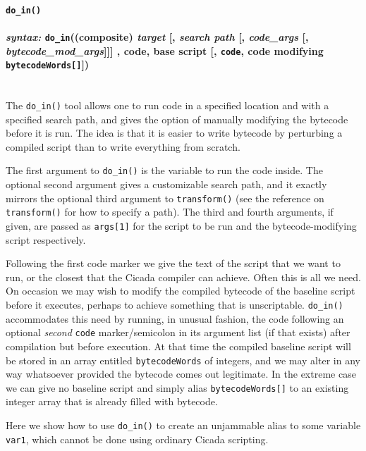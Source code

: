 \documentclass{article}
\begin{document}

\paragraph{\texttt{do\_in()}\\\\
\normalfont \emph{syntax: } \texttt{do\_in}((composite) \emph{target} [, \emph{search path} [, \emph{code\_args} [, \emph{bytecode\_mod\_args}]]] , code, base script [, \texttt{code}, code modifying \texttt{bytecodeWords[]}])\\\\}

The \verb#do_in()# tool allows one to run code in a specified location and with a specified search path, and gives the option of manually modifying the bytecode before it is run.  The idea is that it is easier to write bytecode by perturbing a compiled script than to write everything from scratch.

The first argument to \verb#do_in()# is the variable to run the code inside.  The optional second argument gives a customizable search path, and it exactly mirrors the optional third argument to \verb#transform()# (see the reference on \verb#transform()# for how to specify a path).  The third and fourth arguments, if given, are passed as \verb#args[1]# for the script to be run and the bytecode-modifying script respectively.

Following the first code marker we give the text of the script that we want to run, or the closest that the Cicada compiler can achieve.  Often this is all we need.  On occasion we may wish to modify the compiled bytecode of the baseline script before it executes, perhaps to achieve something that is unscriptable.  \verb#do_in()# accommodates this need by running, in unusual fashion, the code following an optional \emph{second} \verb#code# marker/semicolon in its argument list (if that exists) after compilation but before execution.   At that time the compiled baseline script will be stored in an array entitled \verb#bytecodeWords# of integers, and we may alter in any way whatsoever provided the bytecode comes out legitimate.  In the extreme case we can give no baseline script and simply alias \verb#bytecodeWords[]# to an existing integer array that is already filled with bytecode.

Here we show how to use \verb#do_in()# to create an unjammable alias to some variable \verb#var1#, which cannot be done using ordinary Cicada scripting.
\end{document}
